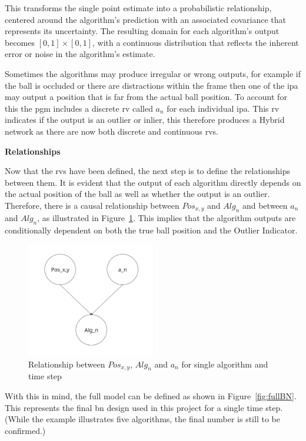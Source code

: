 \documentclass[12pt,a4paper]{article}
\begin{document}
This transforms the single point estimate into a probabilistic relationship, centered around the algorithm's prediction with an associated covariance that represents its uncertainty. The resulting domain for each algorithm’s output becomes $[0,1]\times[0,1]$, with a continuous distribution that reflects the inherent error or noise in the algorithm's estimate.

Sometimes the algorithms may produce irregular or wrong outputs, for example if the ball is occluded or there are distractions within the frame then one of the \acs{ipa} may output a position that is far from the actual ball position. To account for this the \acs{pgm} includes a discrete \acs{rv} called $a_n$ for each individual \acs{ipa}. This \acs{rv} indicates if the output is an outlier or inlier, this therefore produces a Hybrid network as there are now both discrete and continuous \acs{rv}s.

\textbf{Relationships}

Now that the \acs{rv}s have been defined, the next step is to define the relationships between them. It is evident that the output of each algorithm directly depends on the actual position of the ball as well as whether the output is an outlier. Therefore, there is a causal relationship between $Pos_{x,y}$ and $Alg_n$ and between $a_n$ and $Alg_n$, as illustrated in Figure~\ref{fig:smallBN}. This implies that the algorithm outputs are conditionally dependent on both the true ball position and the Outlier Indicator.

\begin{figure}[H]
	\centering
	\includegraphics[width=0.5\textwidth]{smallBN.jpg}
	\caption{Relationship between $Pos_{x,y}$, $Alg_n$ and $a_n$ for single algorithm and time step}
	\label{fig:smallBN}
\end{figure}

With this in mind, the full model can be defined as shown in Figure~\ref{fig:fullBN}. This represents the final \acs{bn} design used in this project for a single time step. (While the example illustrates five algorithms, the final number is still to be confirmed.)
\end{document}
